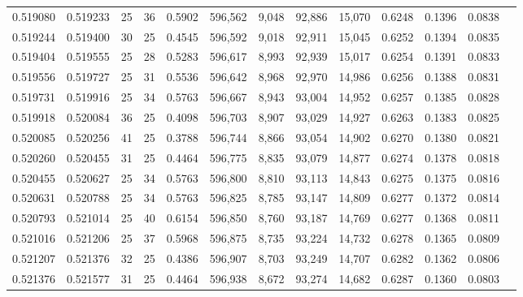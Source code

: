 \begin{tabular}{rrrrrrrrrrrrr}
0.519080 & 0.519233 &    25 &  36 &                                     0.5902 & 596,562 &   9,048 &  92,886 &  15,070 & 0.6248 & 0.1396 & 0.0838 \\
0.519244 & 0.519400 &    30 &  25 &                                     0.4545 & 596,592 &   9,018 &  92,911 &  15,045 & 0.6252 & 0.1394 & 0.0835 \\
0.519404 & 0.519555 &    25 &  28 &                                     0.5283 & 596,617 &   8,993 &  92,939 &  15,017 & 0.6254 & 0.1391 & 0.0833 \\
0.519556 & 0.519727 &    25 &  31 &                                     0.5536 & 596,642 &   8,968 &  92,970 &  14,986 & 0.6256 & 0.1388 & 0.0831 \\
0.519731 & 0.519916 &    25 &  34 &                                     0.5763 & 596,667 &   8,943 &  93,004 &  14,952 & 0.6257 & 0.1385 & 0.0828 \\
0.519918 & 0.520084 &    36 &  25 &                                     0.4098 & 596,703 &   8,907 &  93,029 &  14,927 & 0.6263 & 0.1383 & 0.0825 \\
0.520085 & 0.520256 &    41 &  25 &                                     0.3788 & 596,744 &   8,866 &  93,054 &  14,902 & 0.6270 & 0.1380 & 0.0821 \\
0.520260 & 0.520455 &    31 &  25 &                                     0.4464 & 596,775 &   8,835 &  93,079 &  14,877 & 0.6274 & 0.1378 & 0.0818 \\
0.520455 & 0.520627 &    25 &  34 &                                     0.5763 & 596,800 &   8,810 &  93,113 &  14,843 & 0.6275 & 0.1375 & 0.0816 \\
0.520631 & 0.520788 &    25 &  34 &                                     0.5763 & 596,825 &   8,785 &  93,147 &  14,809 & 0.6277 & 0.1372 & 0.0814 \\
0.520793 & 0.521014 &    25 &  40 &                                     0.6154 & 596,850 &   8,760 &  93,187 &  14,769 & 0.6277 & 0.1368 & 0.0811 \\
0.521016 & 0.521206 &    25 &  37 &                                     0.5968 & 596,875 &   8,735 &  93,224 &  14,732 & 0.6278 & 0.1365 & 0.0809 \\
0.521207 & 0.521376 &    32 &  25 &                                     0.4386 & 596,907 &   8,703 &  93,249 &  14,707 & 0.6282 & 0.1362 & 0.0806 \\
0.521376 & 0.521577 &    31 &  25 &                                     0.4464 & 596,938 &   8,672 &  93,274 &  14,682 & 0.6287 & 0.1360 & 0.0803 \\

\end{tabular}
